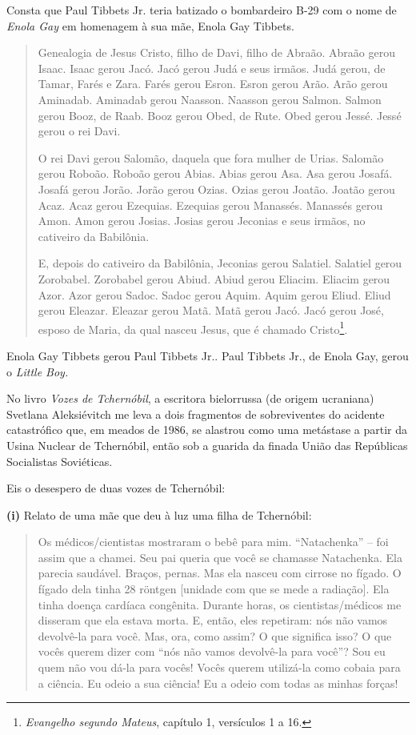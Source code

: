 Consta que Paul Tibbets Jr. teria batizado o bombardeiro B-29 com o nome
de \emph{Enola Gay} em homenagem à sua mãe, Enola Gay Tibbets.

\begin{quote}
Genealogia de Jesus Cristo, filho de Davi, filho de Abraão. Abraão gerou
Isaac. Isaac gerou Jacó. Jacó gerou Judá e seus irmãos. Judá gerou, de
Tamar, Farés e Zara. Farés gerou Esron. Esron gerou Arão. Arão gerou
Aminadab. Aminadab gerou Naasson. Naasson gerou Salmon. Salmon gerou
Booz, de Raab. Booz gerou Obed, de Rute. Obed gerou Jessé. Jessé gerou o
rei Davi.

O rei Davi gerou Salomão, daquela que fora mulher de Urias. Salomão
gerou Roboão. Roboão gerou Abias. Abias gerou Asa. Asa gerou Josafá.
Josafá gerou Jorão. Jorão gerou Ozias. Ozias gerou Joatão. Joatão gerou
Acaz. Acaz gerou Ezequias. Ezequias gerou Manassés. Manassés gerou Amon.
Amon gerou Josias. Josias gerou Jeconias e seus irmãos, no cativeiro da
Babilônia.

E, depois do cativeiro da Babilônia, Jeconias gerou Salatiel. Salatiel
gerou Zorobabel. Zorobabel gerou Abiud. Abiud gerou Eliacim. Eliacim
gerou Azor. Azor gerou Sadoc. Sadoc gerou Aquim. Aquim gerou Eliud.
Eliud gerou Eleazar. Eleazar gerou Matã. Matã gerou Jacó. Jacó gerou
José, esposo de Maria, da qual nasceu Jesus, que é chamado
Cristo\footnote{\emph{Evangelho segundo Mateus}, capítulo 1, versículos
  1 a 16.}.
\end{quote}

Enola Gay Tibbets gerou Paul Tibbets Jr.. Paul Tibbets Jr., de Enola
Gay, gerou o \emph{Little Boy. }

No livro \emph{Vozes de Tchernóbil}, a escritora bielorrussa (de origem
ucraniana) Svetlana Aleksiévitch me leva a dois fragmentos de
sobreviventes do acidente catastrófico que, em meados de 1986, se
alastrou como uma metástase a partir da Usina Nuclear de Tchernóbil,
então sob a guarida da finada União das Repúblicas Socialistas
Soviéticas.

Eis o desespero de duas vozes de Tchernóbil:

\textbf{(i)} Relato de uma mãe que deu à luz uma filha de Tchernóbil:

\begin{quote}
Os médicos/cientistas mostraram o bebê para mim. ``Natachenka'' -- foi
assim que a chamei. Seu pai queria que você se chamasse Natachenka. Ela
parecia saudável. Braços, pernas. Mas ela nasceu com cirrose no fígado.
O fígado dela tinha 28 röntgen {[}unidade com que se mede a radiação{]}.
Ela tinha doença cardíaca congênita. Durante horas, os
cientistas/médicos me disseram que ela estava morta. E, então, eles
repetiram: nós não vamos devolvê-la para você. Mas, ora, como assim? O
que significa isso? O que vocês querem dizer com ``nós não vamos
devolvê-la para você''? Sou eu quem não vou dá-la para vocês! Vocês
querem utilizá-la como cobaia para a ciência. Eu odeio a sua ciência! Eu
a odeio com todas as minhas forças!
\end{quote}

